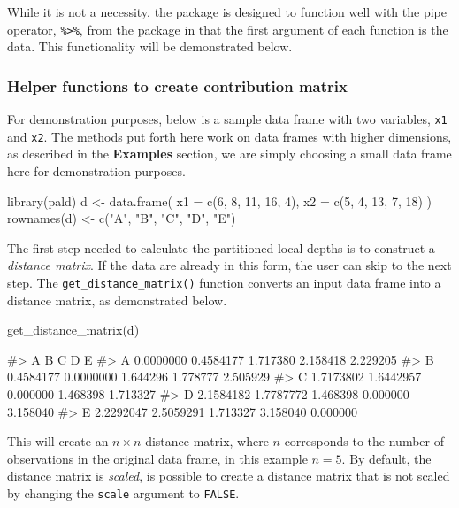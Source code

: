 While it is not a necessity, the  package is designed to
function well with the pipe operator, \texttt{\%\textgreater{}\%}, from
the \citet{magrittr}  package in that the first
argument of each function is the data. This functionality will be
demonstrated below.

\hypertarget{helper-functions-to-create-contribution-matrix}{%
\subsubsection{Helper functions to create contribution
matrix}\label{helper-functions-to-create-contribution-matrix}}

For demonstration purposes, below is a sample data frame with two
variables, \texttt{x1} and \texttt{x2}. The methods put forth here work
on data frames with higher dimensions, as described in the
\textbf{Examples} section, we are simply choosing a small data frame
here for demonstration purposes.

\begin{Schunk}
\begin{Sinput}
library(pald)
d <- data.frame(
  x1 = c(6, 8, 11, 16, 4),
  x2 = c(5, 4, 13, 7, 18)
)
rownames(d) <- c("A", "B", "C", "D", "E")
\end{Sinput}
\end{Schunk}

The first step needed to calculate the partitioned local depths is to
construct a \emph{distance matrix}. If the data are already in this
form, the user can skip to the next step. The
\texttt{get\_distance\_matrix()} function converts an input data frame
into a distance matrix, as demonstrated below.

\begin{Schunk}
\begin{Sinput}
get_distance_matrix(d)
\end{Sinput}
\begin{Soutput}
#>           A         B        C        D        E
#> A 0.0000000 0.4584177 1.717380 2.158418 2.229205
#> B 0.4584177 0.0000000 1.644296 1.778777 2.505929
#> C 1.7173802 1.6442957 0.000000 1.468398 1.713327
#> D 2.1584182 1.7787772 1.468398 0.000000 3.158040
#> E 2.2292047 2.5059291 1.713327 3.158040 0.000000
\end{Soutput}
\end{Schunk}

This will create an \(n\times n\) distance matrix, where \(n\)
corresponds to the number of observations in the original data frame, in
this example \(n = 5\). By default, the distance matrix is
\emph{scaled}, is possible to create a distance matrix that is not
scaled by changing the \texttt{scale} argument to \texttt{FALSE}.

